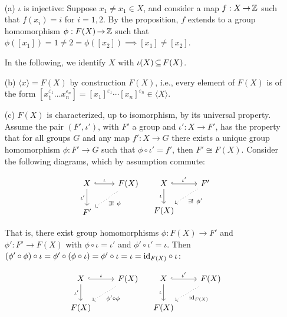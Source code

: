 \documentclass[11pt]{book}
\theoremstyle{definition}   \newtheorem{defn}[counter]{Definition} %
\newcommand{\ve}{\varepsilon}   \newcommand{\im}{\textnormal{im }}   \newcommand{\re}{\textnormal{Re }}   \newcommand{\mb}[1]{\mathbf{#1}}
\newcommand{\gen}[1]{\langle #1 \rangle}   \newcommand{\stab}[2]{\tn{Stab}_{#1}(#2)}   \newcommand{\fix}[2]{\tn{Fix}_{#1}(#2)}
\DeclareMathOperator{\ra}{\rightarrow}   \DeclareMathOperator{\Poly}{\mathbf{P}}   \DeclareMathOperator{\spn}{\textnormal{span}}   \DeclareMathOperator{\aut}{\textnormal{Aut}}
\numberwithin{counter}{chapter}
\begin{document}
\begin{remark}
\
\begin{enumerate}
\item[(a)] $\iota$ is injective: Suppose $x_1 \ne x_1 \in X$, and consider a map $f : X \ra \z$ such that $f(x_i) = i$ for $i = 1,2$. By the proposition, $f$ extends to a group homomorphism $\phi : F(X) \ra \z$ such that $\phi([x_1]) = 1 \ne 2 = \phi([x_2]) \implies [x_1] \ne [x_2]$.

In the following, we identify $X$ with $\iota(X) \operatorname{\subseteq} F(X)$.

\item[(b)] $\gen{x} = F(X)$ by construction $F(X)$, i.e., every element of $F(X)$ is of the form $[x_1^{\ve_1} \dots x_n^{\ve_n}] = [x_1]^{\ve_1} \cdots [x_n]^{\ve_n} \in \gen{X}$.

\item[(c)] $F(X)$ is characterized, up to isomorphism, by its universal property. Assume the pair $(F',\iota ')$, with $F'$ a group and $\iota' : X \ra F'$, has the property that for all groups $G$ and any map $f' : X \ra G$ there exists a unique group homomorphism $\phi : F' \ra G$ such that $\phi \circ \iota' = f'$, then $F' \cong F(X)$. Consider the following diagrams, which by assumption commute:
\begin{center}
\[
\begin{array}{cc}
\begin{tikzcd}
X \arrow[hookrightarrow]{r}{\iota}
\arrow[swap]{d}{\iota'}
& F(X) \arrow[dotted]{dl}{\exists ! \ \phi} \\
F'
\end{tikzcd} &
\begin{tikzcd}
X \arrow[hookrightarrow]{r}{\iota'}
\arrow[swap]{d}{\iota}
& F' \arrow[dotted]{dl}{\exists ! \ \phi'} \\
F(X)
\end{tikzcd}
\end{array}\]
\end{center}

That is, there exist group homomorphisms $\phi : F(X) \ra F'$ and $\phi' : F' \ra F(X)$ with $\phi \circ \iota = \iota'$ and $\phi' \circ \iota' = \iota$. Then $(\phi' \circ \phi) \circ \iota = \phi' \circ (\phi \circ \iota) = \phi' \circ \iota = \iota = \textnormal{id}_{F(X)} \circ \iota$:
\begin{center}
\[
\begin{array}{cc}
\begin{tikzcd}
X \arrow[hookrightarrow]{r}{\iota}
\arrow[swap]{d}{\iota'}
& F(X) \arrow[dotted]{dl}{\phi' \circ \phi} \\
F(X)
\end{tikzcd} &
\begin{tikzcd}
X \arrow[hookrightarrow]{r}{\iota'}
\arrow[swap]{d}{\iota}
& F(X) \arrow[dotted]{dl}{\id_{F(X)}} \\
F(X)
\end{tikzcd}
\end{array}\]
\end{center}


\end{enumerate}
\end{remark}
\end{document}
